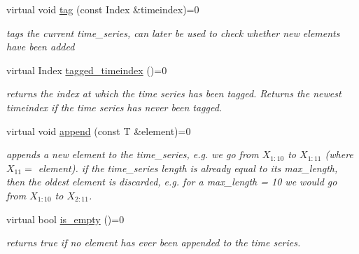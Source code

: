 \begin{DoxyCompactItemize}
virtual void \hyperlink{classtime__series_1_1TimeSeriesInterface_a34e881c9496901127baf1d907d7399ac}{tag} (const Index \&timeindex)=0
\begin{DoxyCompactList}\small\item\em tags the current time\+\_\+series, can later be used to check whether new elements have been added \end{DoxyCompactList}\item 
\mbox{\label{classtime__series_1_1TimeSeriesInterface_aa71ab509ac29c5da681aee9dbf65f2d8}} 
virtual Index \hyperlink{classtime__series_1_1TimeSeriesInterface_aa71ab509ac29c5da681aee9dbf65f2d8}{tagged\+\_\+timeindex} ()=0
\begin{DoxyCompactList}\small\item\em returns the index at which the time series has been tagged. Returns the newest timeindex if the time series has never been tagged. \end{DoxyCompactList}\item 
\mbox{\label{classtime__series_1_1TimeSeriesInterface_a0782c522287cf041fc253529b61041f9}} 
virtual void \hyperlink{classtime__series_1_1TimeSeriesInterface_a0782c522287cf041fc253529b61041f9}{append} (const T \&element)=0
\begin{DoxyCompactList}\small\item\em appends a new element to the time\+\_\+series, e.\+g. we go from $ X_{1:10} $ to $ X_{1:11} $ (where $ X_{11}=$ element). if the time\+\_\+series length is already equal to its max\+\_\+length, then the oldest element is discarded, e.\+g. for a max\+\_\+length = 10 we would go from $ X_{1:10} $ to $ X_{2:11} $. \end{DoxyCompactList}\item 
\mbox{\label{classtime__series_1_1TimeSeriesInterface_a932e891f3f41781af4282ada18f05d31}} 
virtual bool \hyperlink{classtime__series_1_1TimeSeriesInterface_a932e891f3f41781af4282ada18f05d31}{is\+\_\+empty} ()=0
\begin{DoxyCompactList}\small\item\em returns true if no element has ever been appended to the time series. \end{DoxyCompactList}\end{DoxyCompactItemize}


